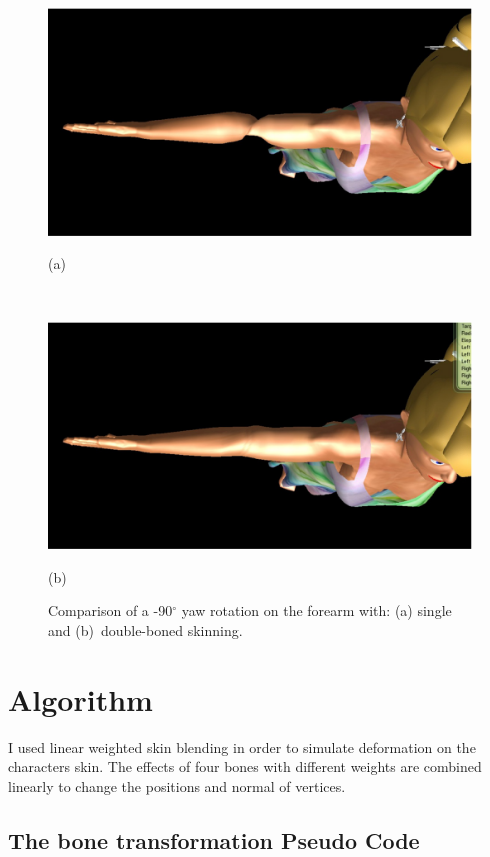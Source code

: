 \begin{figure}[htbp]
	\centerline{\includegraphics[width=1.0\columnwidth]{./figures/fore-arm-single-bone.eps}}
	\centerline{(a)}
	\centerline{\ }
	\centerline{\includegraphics[width=1.0\columnwidth]{./figures/fore-arm-double-bone.eps}}
	\centerline{(b)}
	\caption{Comparison of a -90$^\circ$ yaw rotation on the forearm with: (a) single and (b)~double-boned skinning.}
	\label{fig:forearm-comparison}
\end{figure}

\section{Algorithm}
\label{section_animation_algorithm}

I used linear weighted skin blending \cite{Kavan2003} in order to simulate deformation on the characters skin. The effects of four bones with different weights are combined linearly to change the positions and normal of vertices.

\subsection{The bone transformation Pseudo Code}

